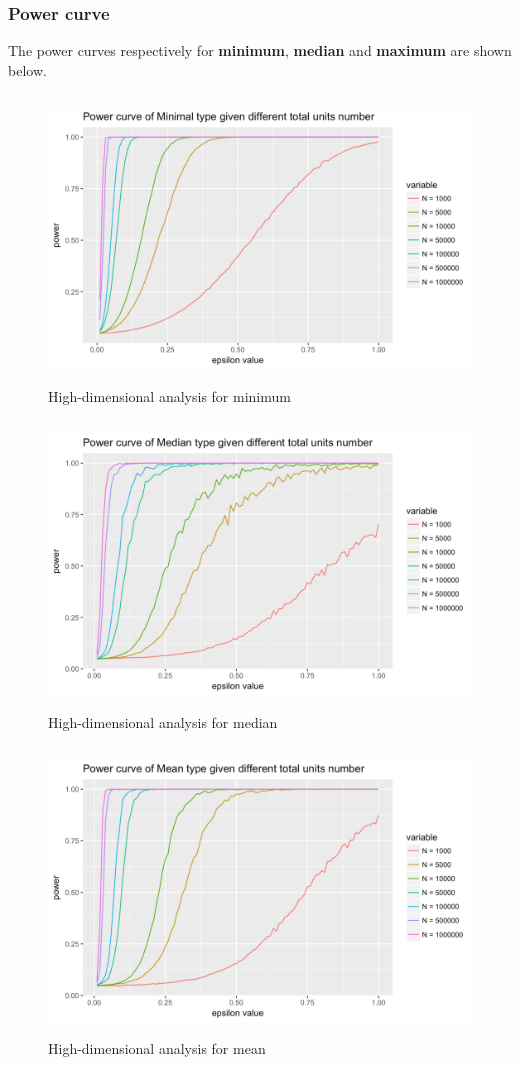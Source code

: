 \documentclass[10pt,english]{article}\usepackage{graphicx, color}
\numberwithin{equation}{section}
\numberwithin{figure}{section}
\begin{document}
\subsubsection{Power curve}
The power curves respectively for \textbf{minimum}, \textbf{median} and \textbf{maximum} are shown below.
\begin{figure}[htbp]
\centering\includegraphics[width=4.5in, height=3in]{min}
\caption{High-dimensional analysis for minimum}
\end{figure}
\begin{figure}[htbp]
\centering\includegraphics[width=4.5in, height=3in]{median}
\caption{High-dimensional analysis for median}
\end{figure}
\newpage
\begin{figure}[htbp]
\centering\includegraphics[width=4.5in, height=3in]{mean}
\caption{High-dimensional analysis for mean}
\end{figure}
\end{document}
